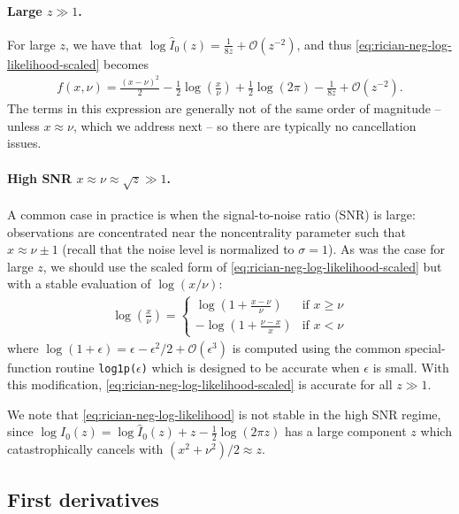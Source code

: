 \documentclass{article}
\begin{document}
\paragraph{Large $z \gg 1$.}

For large $z$, we have that $\log \hat{I}_0(z) = \frac{1}{8 z} + \mathcal{O}(z^{-2})$, and thus \cref{eq:rician-neg-log-likelihood-scaled} becomes
%
\begin{align}
  f(x, \nu) = \frac{(x-\nu)^2}{2} - \frac{1}{2}\log\left(\frac{x}{\nu}\right) + \frac{1}{2}\log(2\pi) - \frac{1}{8 z} + \mathcal{O}(z^{-2}).
\end{align}
%
The terms in this expression are generally not of the same order of magnitude -- unless $x \approx \nu$, which we address next -- so there are typically no cancellation issues.

\paragraph{High SNR $x \approx \nu \approx \sqrt{z} \gg 1$.}

A common case in practice is when the signal-to-noise ratio (SNR) is large:
observations are concentrated near the noncentrality parameter such that $x \approx \nu \pm 1$ (recall that the noise level is normalized to $\sigma=1$).
As was the case for large $z$, we should use the scaled form of \cref{eq:rician-neg-log-likelihood-scaled} but with a stable evaluation of $\log(x/\nu)$:
%
\begin{align}
  \log\left(\frac{x}{\nu}\right) = \begin{cases}
    \log\left(1 + \frac{x-\nu}{\nu}\right) & \text{if } x \ge \nu \\
    -\log\left(1 + \frac{\nu-x}{x}\right)  & \text{if } x < \nu
  \end{cases}
\end{align}
%
where $\log(1 + \epsilon) = \epsilon - \epsilon^2/2 + \mathcal{O}(\epsilon^3)$ is computed using the common special-function routine \texttt{log1p($\epsilon$)} which is designed to be accurate when $\epsilon$ is small.
With this modification, \cref{eq:rician-neg-log-likelihood-scaled} is accurate for all $z \gg 1$.

We note that \cref{eq:rician-neg-log-likelihood} is not stable in the high SNR regime, since $\log I_0(z) = \log \hat{I}_0(z) + z - \frac{1}{2}\log(2\pi z)$ has a large component $z$ which catastrophically cancels with $(x^2 + \nu^2) / 2 \approx z$.

\subsection{First derivatives}
\end{document}
